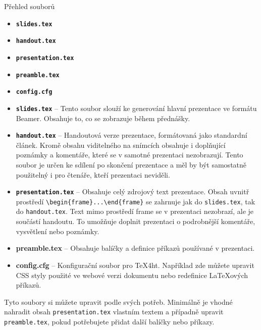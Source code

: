 \begin{frame}[fragile]{Přehled souborů}
\begin{itemize}
\item \textbf{\texttt{slides.tex}}
\item \textbf{\texttt{handout.tex}}
\item \textbf{\texttt{presentation.tex}}
\item \textbf{\texttt{preamble.tex}}
\item \textbf{\texttt{config.cfg}}
\end{itemize}
\end{frame}

\begin{itemize}
\item \textbf{\texttt{slides.tex}} – Tento soubor slouží ke generování hlavní prezentace ve formátu Beamer. Obsahuje to, co se zobrazuje během přednášky.

\item \textbf{\texttt{handout.tex}} – Handoutová verze prezentace, formátovaná jako standardní článek. Kromě obsahu viditelného na snímcích obsahuje i doplňující poznámky a komentáře, které se v samotné prezentaci nezobrazují. Tento soubor je určen ke sdílení po skončení prezentace a měl by být samostatně použitelný i pro čtenáře, kteří prezentaci neviděli.

\item \textbf{\texttt{presentation.tex}} – Obsahuje celý zdrojový text prezentace. Obsah uvnitř prostředí \verb|\begin{frame}...\end{frame}| se zahrnuje jak do \texttt{slides.tex}, tak do \texttt{handout.tex}. Text mimo prostředí frame se v prezentaci nezobrazí, ale je součástí handoutu. To umožňuje doplnit prezentaci o podrobnější komentáře, vysvětlení nebo poznámky.

\item \textbf{preamble.tex} – Obsahuje balíčky a definice příkazů používané v prezentaci.

\item \textbf{config.cfg} – Konfigurační soubor pro \TeX4ht. Například zde můžete upravit CSS styly použité ve webové verzi dokumentu nebo redefinice \LaTeX{}ových příkazů.
\end{itemize}

Tyto soubory si můžete upravit podle svých potřeb. Minimálně je vhodné nahradit obsah \texttt{presentation.tex} vlastním textem a případně upravit \texttt{preamble.tex}, pokud potřebujete přidat další balíčky nebo příkazy.

